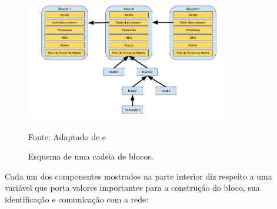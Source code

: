 \begin{figure}[ht]
\caption{Esquema de uma cadeia de blocos.}
\centering
\includegraphics[width=0.8\textwidth]{imagens/esquema_blockchain.png}
\begin{center}
        Fonte: Adaptado de \cite{blockchain:bitcoin_whitepaper} e \cite{blockchain:seguranca_desafios}
\end{center}
\label{fig:esquema_blockchain}
\end{figure}

%
Cada um dos componentes mostrados na parte interior diz respeito a uma variável que porta valores importantes para a construção do bloco, sua identificação e comunicação com a rede:

